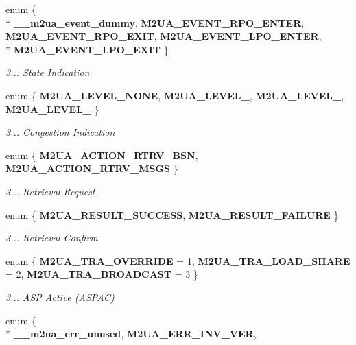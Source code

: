 \begin{DoxyCompactItemize}
\item 
enum \{ \\*
{\bf \+\_\+\+\_\+m2ua\+\_\+event\+\_\+dummy}, 
{\bf M2\+U\+A\+\_\+\+E\+V\+E\+N\+T\+\_\+\+R\+P\+O\+\_\+\+E\+N\+T\+ER}, 
{\bf M2\+U\+A\+\_\+\+E\+V\+E\+N\+T\+\_\+\+R\+P\+O\+\_\+\+E\+X\+IT}, 
{\bf M2\+U\+A\+\_\+\+E\+V\+E\+N\+T\+\_\+\+L\+P\+O\+\_\+\+E\+N\+T\+ER}, 
\\*
{\bf M2\+U\+A\+\_\+\+E\+V\+E\+N\+T\+\_\+\+L\+P\+O\+\_\+\+E\+X\+IT}
 \}\begin{DoxyCompactList}\small\item\em 3... State Indication \end{DoxyCompactList}
\item 
enum \{ {\bf M2\+U\+A\+\_\+\+L\+E\+V\+E\+L\+\_\+\+N\+O\+NE}, 
{\bf M2\+U\+A\+\_\+\+L\+E\+V\+E\+L\+\_}, 
{\bf M2\+U\+A\+\_\+\+L\+E\+V\+E\+L\+\_}, 
{\bf M2\+U\+A\+\_\+\+L\+E\+V\+E\+L\+\_}
 \}\begin{DoxyCompactList}\small\item\em 3... Congestion Indication \end{DoxyCompactList}
\item 
enum \{ {\bf M2\+U\+A\+\_\+\+A\+C\+T\+I\+O\+N\+\_\+\+R\+T\+R\+V\+\_\+\+B\+SN}, 
{\bf M2\+U\+A\+\_\+\+A\+C\+T\+I\+O\+N\+\_\+\+R\+T\+R\+V\+\_\+\+M\+S\+GS}
 \}\begin{DoxyCompactList}\small\item\em 3... Retrieval Request \end{DoxyCompactList}
\item 
enum \{ {\bf M2\+U\+A\+\_\+\+R\+E\+S\+U\+L\+T\+\_\+\+S\+U\+C\+C\+E\+SS}, 
{\bf M2\+U\+A\+\_\+\+R\+E\+S\+U\+L\+T\+\_\+\+F\+A\+I\+L\+U\+RE}
 \}\begin{DoxyCompactList}\small\item\em 3... Retrieval Confirm \end{DoxyCompactList}
\item 
enum \{ {\bf M2\+U\+A\+\_\+\+T\+R\+A\+\_\+\+O\+V\+E\+R\+R\+I\+DE} = 1, 
{\bf M2\+U\+A\+\_\+\+T\+R\+A\+\_\+\+L\+O\+A\+D\+\_\+\+S\+H\+A\+RE} = 2, 
{\bf M2\+U\+A\+\_\+\+T\+R\+A\+\_\+\+B\+R\+O\+A\+D\+C\+A\+ST} = 3
 \}\begin{DoxyCompactList}\small\item\em 3... A\+SP Active (A\+S\+P\+AC) \end{DoxyCompactList}
\item 
enum \{ \\*
{\bf \+\_\+\+\_\+m2ua\+\_\+err\+\_\+unused}, 
{\bf M2\+U\+A\+\_\+\+E\+R\+R\+\_\+\+I\+N\+V\+\_\+\+V\+ER}, 

\end{DoxyCompactItemize}
